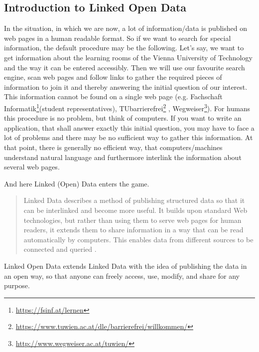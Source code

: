 \documentclass{article}
\begin{document}
\subsection{Introduction to Linked Open Data}
\label{questionaire:lod-intro}
In the situation, in which we are now, a lot of information/data is published on web pages in a human readable format. So if we want to search for special information, the default procedure may be the following. Let’s say, we want to get information about the learning rooms of the Vienna University of Technology and the way it can be entered accessibly. Then we will use our favourite search engine, scan web pages and follow links to gather the required pieces of information to join it and thereby answering the initial question of our interest. This information cannot be found on a single web page (e.g. Fachschaft Informatik\footnote{\url{https://fsinf.at/lernen}}(student representatives), TUbarrierefrei\footnote{\url{https://www.tuwien.ac.at/dle/barrierefrei/willkommen/}} , Wegweiser\footnote{\url{http://www.wegweiser.ac.at/tuwien/}}). For humans this procedure is no problem, but think of computers. If you want to write an application, that shall answer exactly this initial question, you may have to face a lot of problems and there may be no sufficient way to gather this information. At that point, there is generally no efficient way, that computers/machines understand natural language and furthermore interlink the information about several web pages.

And here Linked (Open) Data enters the game.\begin{quote} Linked Data describes a method of publishing structured data so that it can be interlinked and become more useful. It builds upon standard Web technologies, but rather than using them to serve web pages for human readers, it extends them to share information in a way that can be read automatically by computers. This enables data from different sources to be connected and queried
\cite{bizer_linked_2009}.\end{quote} Linked Open Data extends Linked Data with the idea of publishing the data in an open way, so that anyone can freely access, use, modify, and share for any purpose.
\end{document}
